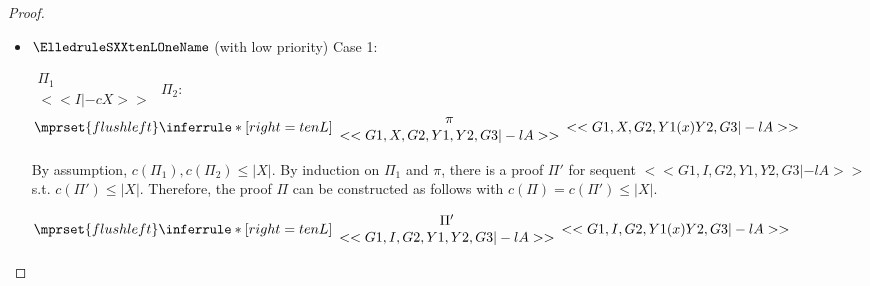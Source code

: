 \begin{proof}
\begin{enumerate}
\begin{itemize}
  \item $\ElledruleSXXtenLOneName$ (with low priority) Case 1:
      \begin{center}
        \scriptsize
        \begin{math}
          \begin{array}{c}
            \Pi_1 \\
            {<<I |-c X>>}
          \end{array}
        \end{math}
        \qquad\qquad
        $\Pi_2$:
        \begin{math}
          $$\mprset{flushleft}
          \inferrule* [right={\tiny tenL}] {
            {
              \begin{array}{c}
                \pi \\
                {<<G1, X, G2, Y1, Y2, G3 |-l A>>}
              \end{array}
            }
          }{<<G1, X, G2, Y1 (x) Y2, G3 |-l A>>}
        \end{math}
      \end{center}
      By assumption, $c(\Pi_1),c(\Pi_2)\leq |X|$. By induction on $\Pi_1$ and $\pi$, there is
      a proof $\Pi'$ for sequent $<<G1, I, G2, Y1, Y2, G3 |-l A>>$ s.t. $c(\Pi') \leq |X|$.
      Therefore, the proof $\Pi$ can be constructed as follows with
      $c(\Pi) = c(\Pi') \leq |X|$.
      \begin{center}
        \scriptsize
        \begin{math}
          $$\mprset{flushleft}
          \inferrule* [right={\tiny tenL}] {
            {
              \begin{array}{c}
                \Pi' \\
                {<<G1, I, G2, Y1, Y2, G3 |-l A>>}
              \end{array}
            }
          }{<<G1, I, G2, Y1 (x) Y2, G3 |-l A>>}
        \end{math}
      \end{center}


\end{itemize}
\end{enumerate}
\end{proof}
